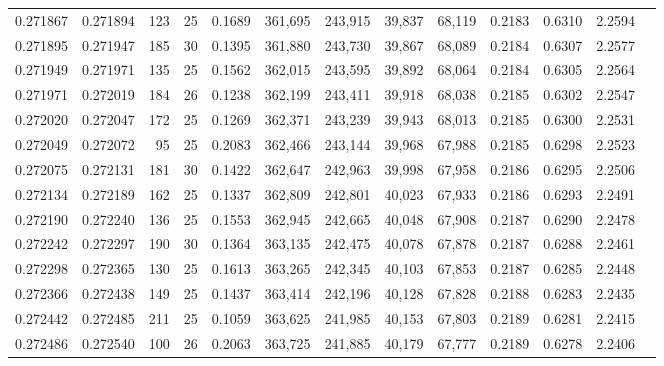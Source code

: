 \begin{tabular}{rrrrrrrrrrrrr}
0.271867 & 0.271894 &   123 &  25 &                                     0.1689 & 361,695 & 243,915 &  39,837 &  68,119 & 0.2183 & 0.6310 & 2.2594 \\
0.271895 & 0.271947 &   185 &  30 &                                     0.1395 & 361,880 & 243,730 &  39,867 &  68,089 & 0.2184 & 0.6307 & 2.2577 \\
0.271949 & 0.271971 &   135 &  25 &                                     0.1562 & 362,015 & 243,595 &  39,892 &  68,064 & 0.2184 & 0.6305 & 2.2564 \\
0.271971 & 0.272019 &   184 &  26 &                                     0.1238 & 362,199 & 243,411 &  39,918 &  68,038 & 0.2185 & 0.6302 & 2.2547 \\
0.272020 & 0.272047 &   172 &  25 &                                     0.1269 & 362,371 & 243,239 &  39,943 &  68,013 & 0.2185 & 0.6300 & 2.2531 \\
0.272049 & 0.272072 &    95 &  25 &                                     0.2083 & 362,466 & 243,144 &  39,968 &  67,988 & 0.2185 & 0.6298 & 2.2523 \\
0.272075 & 0.272131 &   181 &  30 &                                     0.1422 & 362,647 & 242,963 &  39,998 &  67,958 & 0.2186 & 0.6295 & 2.2506 \\
0.272134 & 0.272189 &   162 &  25 &                                     0.1337 & 362,809 & 242,801 &  40,023 &  67,933 & 0.2186 & 0.6293 & 2.2491 \\
0.272190 & 0.272240 &   136 &  25 &                                     0.1553 & 362,945 & 242,665 &  40,048 &  67,908 & 0.2187 & 0.6290 & 2.2478 \\
0.272242 & 0.272297 &   190 &  30 &                                     0.1364 & 363,135 & 242,475 &  40,078 &  67,878 & 0.2187 & 0.6288 & 2.2461 \\
0.272298 & 0.272365 &   130 &  25 &                                     0.1613 & 363,265 & 242,345 &  40,103 &  67,853 & 0.2187 & 0.6285 & 2.2448 \\
0.272366 & 0.272438 &   149 &  25 &                                     0.1437 & 363,414 & 242,196 &  40,128 &  67,828 & 0.2188 & 0.6283 & 2.2435 \\
0.272442 & 0.272485 &   211 &  25 &                                     0.1059 & 363,625 & 241,985 &  40,153 &  67,803 & 0.2189 & 0.6281 & 2.2415 \\
0.272486 & 0.272540 &   100 &  26 &                                     0.2063 & 363,725 & 241,885 &  40,179 &  67,777 & 0.2189 & 0.6278 & 2.2406 \\

\end{tabular}
